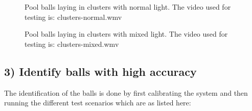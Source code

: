 \begin{figure}[H]
  \centering
  \quad
	\quad
   \caption{Pool balls laying in clusters with normal light. The video used for testing is: clusters-normal.wmv}
  \label{fig:clustersnormal}
\end{figure}


\begin{figure}[H]
  \centering
   \caption{Pool balls laying in clusters with mixed light.  The video used for testing is: clusters-mixed.wmv}
  \label{fig:clustersmixed}
\end{figure}


\subsection{3) Identify balls with high accuracy}

The identification of the balls is done by first calibrating the system and then running the different test scenarios which are as listed here:

